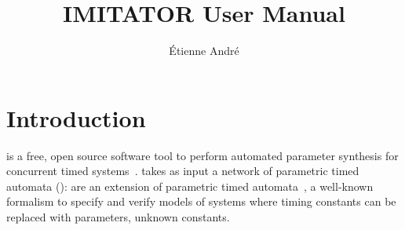 
\newcommand{\titleOnHeader}{\textsf{IMITATOR} user manual}

\newcommand{\titleOnFirstPage}{IMITATOR User Manual}




\title{IMITATOR User Manual}
\author{Étienne André}












\chapter{Introduction}

\imitator{} is a free, open source software tool to perform automated parameter synthesis for concurrent timed systems~\cite{AFKS12}.
\imitator{} takes as input a network of \imitator{} parametric timed automata (\NIPTA{}): \NIPTA{} are an extension of parametric timed automata~\cite{AHV93}, a well-known formalism to specify and verify models of systems where timing constants can be replaced with parameters, \ie{} unknown constants.

